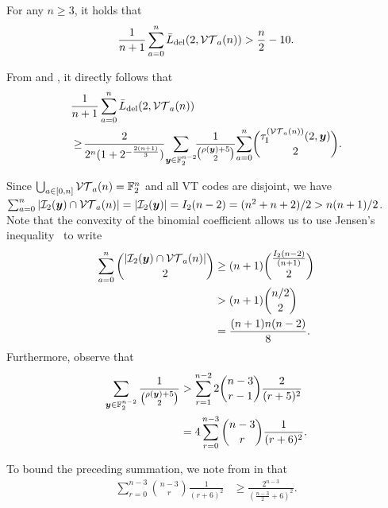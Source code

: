 \documentclass[conference, a4paper]{IEEEtran}
\begin{document}
\begin{theorem}  \label{th::lower-bound-2-del-avg-vt}
    For any $n\geq 3$, it holds that 
    \begin{align*}
        \frac{1}{n+1} \sum_{a=0}^{n} \listdel{2}{\vt{a}{n}} > \frac{n}{2} - 10. %
    \end{align*}    
\end{theorem}
\begin{IEEEproof}
From  and , it directly follows that
\begin{align*}
    &\frac{1}{n+1} \sum_{a=0}^{n} \bar{L}_\mathrm{del}(2,\mathcal{VT}_{a}(n)) \\
    &\geq \! \frac{2}{2^n (1+2^{-\frac{2(n+1)}{3}})} \! \sum_{{\boldsymbol y} \in \mathbb{F}_2^{n-2}} \!\! \frac{1}{\binom{\rho({\boldsymbol y})+5}{2}} \!\sum_{a=0}^{n} \! \binom{\tau_{\mathrm{I}}^{(\mathcal{VT}_{a}(n))}(2,{\boldsymbol y})}{2}.
\end{align*}

Since $\bigcup_{a \in [0,n]} \mathcal{VT}_{a}(n) = \mathbb{F}_2^n$ and all VT codes are disjoint, we have $\sum_{a=0}^{n}|\mathcal{I}_{2}({\boldsymbol y}) \cap \mathcal{VT}_{a}(n)| = |\mathcal{I}_{2}({\boldsymbol y})| = I_2(n-2) = (n^2+n+2)/2 > n(n+1)/2$. Note that the convexity of the binomial coefficient allows us to use Jensen's inequality~\cite{mitzenmacherProbabilityComputingRandomized2005} to write
\begin{align}
    \sum_{a=0}^{n} \binom{|\mathcal{I}_{2}({\boldsymbol y}) \cap \mathcal{VT}_{a}(n)|}{2} &\geq (n+1) \binom{\frac{I_2(n-2)}{(n+1)}}{2} \nonumber \\
    &>(n+1) \binom{n/2}{2} \nonumber\\
    &= \frac{(n+1)n(n-2)}{8}. \label{eq::bound-i2-vta}
\end{align}
Furthermore, observe that
\begin{align}
    \sum_{{\boldsymbol y} \in \mathbb{F}_2^{n-2}} \frac{1}{\binom{\rho({\boldsymbol y})+5}{2}} &> \sum_{r=1}^{n-2} 2\binom{n-3}{r-1} \frac{2}{(r+5)^2} \nonumber \\
    &= 4\sum_{r=0}^{n-3} \binom{n-3}{r} \frac{1}{(r+6)^2}. \label{eq::binom-sum}
\end{align}

To bound the preceding summation, we note from  in  that
\begin{align}
    \sum_{r=0}^{n-3} \binom{n-3}{r} \frac{1}{(r+6)^{2}} &\geq \frac{2^{n-3}}{(\frac{n-3}{2}+6)^2}.\label{eq::binom-sum2}
\end{align}


\end{IEEEproof}
\end{document}
